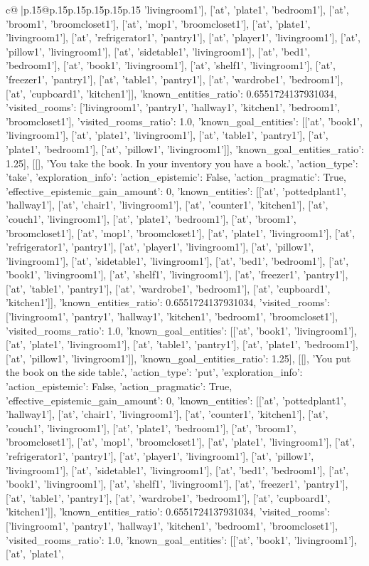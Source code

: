 \documentclass{article}
\begin{document}
{\begin{supertabular}{c@{$\;$}|p{.15\linewidth}@{}p{.15\linewidth}p{.15\linewidth}p{.15\linewidth}p{.15\linewidth}p{.15\linewidth}}
{{{'livingroom1'], ['at', 'plate1', 'bedroom1'], ['at', 'broom1', 'broomcloset1'], ['at', 'mop1', 'broomcloset1'], ['at', 'plate1', 'livingroom1'], ['at', 'refrigerator1', 'pantry1'], ['at', 'player1', 'livingroom1'], ['at', 'pillow1', 'livingroom1'], ['at', 'sidetable1', 'livingroom1'], ['at', 'bed1', 'bedroom1'], ['at', 'book1', 'livingroom1'], ['at', 'shelf1', 'livingroom1'], ['at', 'freezer1', 'pantry1'], ['at', 'table1', 'pantry1'], ['at', 'wardrobe1', 'bedroom1'], ['at', 'cupboard1', 'kitchen1']], 'known_entities_ratio': 0.6551724137931034, 'visited_rooms': ['livingroom1', 'pantry1', 'hallway1', 'kitchen1', 'bedroom1', 'broomcloset1'], 'visited_rooms_ratio': 1.0, 'known_goal_entities': [['at', 'book1', 'livingroom1'], ['at', 'plate1', 'livingroom1'], ['at', 'table1', 'pantry1'], ['at', 'plate1', 'bedroom1'], ['at', 'pillow1', 'livingroom1']], 'known_goal_entities_ratio': 1.25}}], [[], 'You take the book. In your inventory you have a book.', {'action_type': 'take', 'exploration_info': {'action_epistemic': False, 'action_pragmatic': True, 'effective_epistemic_gain_amount': 0, 'known_entities': [['at', 'pottedplant1', 'hallway1'], ['at', 'chair1', 'livingroom1'], ['at', 'counter1', 'kitchen1'], ['at', 'couch1', 'livingroom1'], ['at', 'plate1', 'bedroom1'], ['at', 'broom1', 'broomcloset1'], ['at', 'mop1', 'broomcloset1'], ['at', 'plate1', 'livingroom1'], ['at', 'refrigerator1', 'pantry1'], ['at', 'player1', 'livingroom1'], ['at', 'pillow1', 'livingroom1'], ['at', 'sidetable1', 'livingroom1'], ['at', 'bed1', 'bedroom1'], ['at', 'book1', 'livingroom1'], ['at', 'shelf1', 'livingroom1'], ['at', 'freezer1', 'pantry1'], ['at', 'table1', 'pantry1'], ['at', 'wardrobe1', 'bedroom1'], ['at', 'cupboard1', 'kitchen1']], 'known_entities_ratio': 0.6551724137931034, 'visited_rooms': ['livingroom1', 'pantry1', 'hallway1', 'kitchen1', 'bedroom1', 'broomcloset1'], 'visited_rooms_ratio': 1.0, 'known_goal_entities': [['at', 'book1', 'livingroom1'], ['at', 'plate1', 'livingroom1'], ['at', 'table1', 'pantry1'], ['at', 'plate1', 'bedroom1'], ['at', 'pillow1', 'livingroom1']], 'known_goal_entities_ratio': 1.25}}], [[], 'You put the book on the side table.', {'action_type': 'put', 'exploration_info': {'action_epistemic': False, 'action_pragmatic': True, 'effective_epistemic_gain_amount': 0, 'known_entities': [['at', 'pottedplant1', 'hallway1'], ['at', 'chair1', 'livingroom1'], ['at', 'counter1', 'kitchen1'], ['at', 'couch1', 'livingroom1'], ['at', 'plate1', 'bedroom1'], ['at', 'broom1', 'broomcloset1'], ['at', 'mop1', 'broomcloset1'], ['at', 'plate1', 'livingroom1'], ['at', 'refrigerator1', 'pantry1'], ['at', 'player1', 'livingroom1'], ['at', 'pillow1', 'livingroom1'], ['at', 'sidetable1', 'livingroom1'], ['at', 'bed1', 'bedroom1'], ['at', 'book1', 'livingroom1'], ['at', 'shelf1', 'livingroom1'], ['at', 'freezer1', 'pantry1'], ['at', 'table1', 'pantry1'], ['at', 'wardrobe1', 'bedroom1'], ['at', 'cupboard1', 'kitchen1']], 'known_entities_ratio': 0.6551724137931034, 'visited_rooms': ['livingroom1', 'pantry1', 'hallway1', 'kitchen1', 'bedroom1', 'broomcloset1'], 'visited_rooms_ratio': 1.0, 'known_goal_entities': [['at', 'book1', 'livingroom1'], ['at', 'plate1', }}}
\end{supertabular}}
\end{document}
